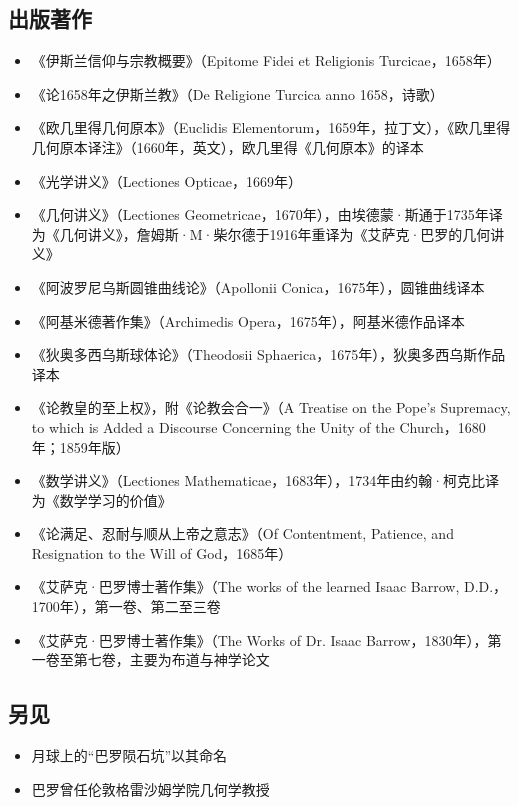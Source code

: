 \subsection{出版著作}
\begin{itemize}
\item 《伊斯兰信仰与宗教概要》（Epitome Fidei et Religionis Turcicae，1658年）
\item 《论1658年之伊斯兰教》（De Religione Turcica anno 1658，诗歌）
\item 《欧几里得几何原本》（Euclidis Elementorum，1659年，拉丁文），《欧几里得几何原本译注》（1660年，英文），欧几里得《几何原本》的译本
\item 《光学讲义》（Lectiones Opticae，1669年）
\item 《几何讲义》（Lectiones Geometricae，1670年），由埃德蒙·斯通于1735年译为《几何讲义》，詹姆斯·M·柴尔德于1916年重译为《艾萨克·巴罗的几何讲义》
\item 《阿波罗尼乌斯圆锥曲线论》（Apollonii Conica，1675年），圆锥曲线译本
\item 《阿基米德著作集》（Archimedis Opera，1675年），阿基米德作品译本
\item 《狄奥多西乌斯球体论》（Theodosii Sphaerica，1675年），狄奥多西乌斯作品译本
\item 《论教皇的至上权》，附《论教会合一》（A Treatise on the Pope's Supremacy, to which is Added a Discourse Concerning the Unity of the Church，1680年；1859年版）
\item 《数学讲义》（Lectiones Mathematicae，1683年），1734年由约翰·柯克比译为《数学学习的价值》
\item 《论满足、忍耐与顺从上帝之意志》（Of Contentment, Patience, and Resignation to the Will of God，1685年）
\item 《艾萨克·巴罗博士著作集》（The works of the learned Isaac Barrow, D.D.，1700年），第一卷、第二至三卷
\item 《艾萨克·巴罗博士著作集》（The Works of Dr. Isaac Barrow，1830年），第一卷至第七卷，主要为布道与神学论文
\end{itemize}
\subsection{另见}
\begin{itemize}
\item 月球上的“巴罗陨石坑”以其命名
\item 巴罗曾任伦敦格雷沙姆学院几何学教授
\end{itemize}
